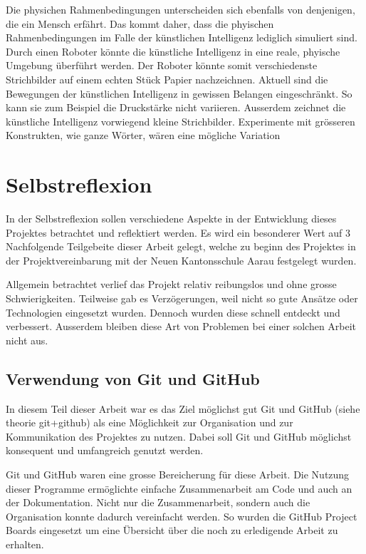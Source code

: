 Die physichen Rahmenbedingungen unterscheiden sich ebenfalls von denjenigen, die
ein Mensch erfährt. Das kommt daher, dass die phyischen Rahmenbedingungen im
Falle der künstlichen Intelligenz lediglich simuliert sind. Durch einen Roboter
könnte die künstliche Intelligenz in eine reale, phyische Umgebung überführt
werden. Der Roboter könnte somit verschiedenste Strichbilder auf einem echten
Stück Papier nachzeichnen. 
Aktuell sind die Bewegungen der künstlichen
Intelligenz in gewissen Belangen eingeschränkt. So kann sie zum Beispiel die
Druckstärke nicht variieren. Ausserdem zeichnet die künstliche Intelligenz
vorwiegend kleine Strichbilder. Experimente mit grösseren Konstrukten, wie ganze
Wörter, wären eine mögliche Variation





\section{Selbstreflexion}
In der Selbstreflexion sollen verschiedene Aspekte in der Entwicklung dieses
Projektes betrachtet und reflektiert werden. Es wird ein besonderer Wert auf 3
Nachfolgende Teilgebeite dieser Arbeit gelegt, welche zu beginn des Projektes in
der Projektvereinbarung mit der Neuen Kantonsschule Aarau festgelegt wurden.

Allgemein betrachtet verlief das Projekt relativ reibungslos und ohne grosse
Schwierigkeiten. Teilweise gab es Verzögerungen, weil nicht so gute Ansätze oder
Technologien eingesetzt wurden. Dennoch wurden diese schnell entdeckt und
verbessert. Ausserdem bleiben diese Art von Problemen bei einer solchen Arbeit
nicht aus.


\subsection*{Verwendung von Git und GitHub}
In diesem Teil dieser Arbeit war es das Ziel möglichst gut Git und GitHub (siehe
theorie git+github)  %
als eine Möglichkeit zur Organisation und zur Kommunikation des Projektes zu
nutzen. Dabei soll Git und GitHub möglichst konsequent und umfangreich genutzt
werden.

Git und GitHub waren eine grosse Bereicherung für diese Arbeit. Die
Nutzung dieser Programme ermöglichte einfache Zusammenarbeit am Code und auch an
der Dokumentation. Nicht nur die Zusammenarbeit, sondern auch die Organisation
konnte dadurch vereinfacht werden. So wurden die GitHub Project Boards
eingesetzt um eine Übersicht über die noch zu erledigende Arbeit zu erhalten.


